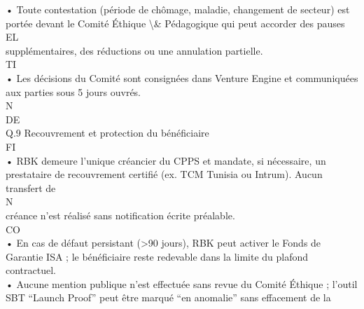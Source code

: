 \documentclass[12pt,landscape,a4paper]{article}
\begin{document}
• Toute contestation (période de chômage, maladie, changement de secteur) est portée devant le Comité Éthique \textbackslash{}& Pédagogique qui peut accorder des pauses\\
\vspace{0.5em}
\vspace{0.5em}
\vspace{0.5em}
\vspace{0.5em}
EL\\
supplémentaires, des réductions ou une annulation partielle.\\
\vspace{0.5em}
\vspace{0.5em}
\vspace{0.5em}
\vspace{0.5em}
TI\\
• Les décisions du Comité sont consignées dans Venture Engine et communiquées aux parties sous 5 jours ouvrés.\\
\vspace{0.5em}
\vspace{0.5em}
\vspace{0.5em}
\vspace{0.5em}
N\\
DE\\
Q.9 Recouvrement et protection du bénéficiaire\\
\vspace{0.5em}
\vspace{0.5em}
\vspace{0.5em}
\vspace{0.5em}
FI\\
• RBK demeure l’unique créancier du CPPS et mandate, si nécessaire, un prestataire de recouvrement certifié (ex. TCM Tunisia ou Intrum). Aucun transfert de\\
\vspace{0.5em}
\vspace{0.5em}
\vspace{0.5em}
N\\
créance n’est réalisé sans notification écrite préalable.\\
CO\\
• En cas de défaut persistant (\textgreater{}90 jours), RBK peut activer le Fonds de Garantie ISA ; le bénéficiaire reste redevable dans la limite du plafond contractuel.\\
\vspace{0.5em}
• Aucune mention publique n’est effectuée sans revue du Comité Éthique ; l’outil SBT “Launch Proof” peut être marqué “en anomalie” sans effacement de la\\
\end{document}
